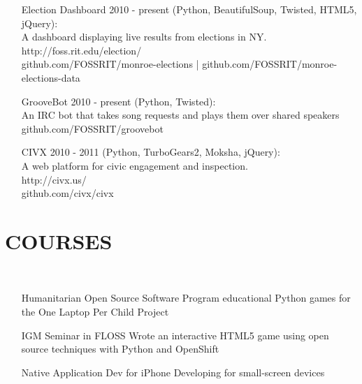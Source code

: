 \documentclass[margin]{res}
\begin{document}
\begin{resume}
\begin{itemize}
        \item[Election Dashboard]
            2010 - present (Python, BeautifulSoup, Twisted, HTML5, jQuery):\\
            A dashboard displaying live results from elections in NY.\\
            http://foss.rit.edu/election/\\
            github.com/FOSSRIT/monroe-elections | github.com/FOSSRIT/monroe-elections-data

        \item[GrooveBot]
            2010 - present (Python, Twisted):\\
            An IRC bot that takes song requests and plays them over shared speakers\\
            github.com/FOSSRIT/groovebot

        \item[CIVX]
            2010 - 2011 (Python, TurboGears2, Moksha, jQuery):\\
            A web platform for civic engagement and inspection.\\
            http://civx.us/\\
            github.com/civx/civx
    \end{itemize}

\section{COURSES}\\
    \begin{itemize}
        \item[Humanitarian Open Source Software] Program educational Python
            games for the One Laptop Per Child Project
        \item[IGM Seminar in FLOSS] Wrote an interactive HTML5 game using open
            source techniques with Python and OpenShift
        \item[Native Application Dev for iPhone] Developing for small-screen
            devices
    \end{itemize}


\end{resume}
\end{document}
